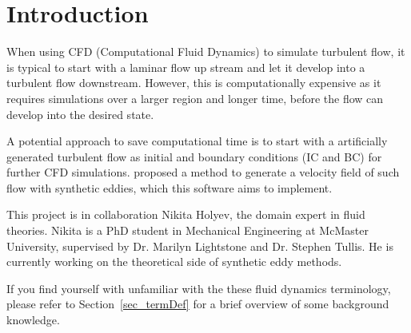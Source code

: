 \documentclass[12pt]{article}
\begin{document}





\section{Introduction}
When using CFD (Computational Fluid Dynamics) to simulate turbulent flow, it is typical to start with a laminar flow up stream and let it develop into a turbulent flow downstream. However, this is computationally expensive as it requires simulations over a larger region and longer time, before the flow can develop into the desired state. 

A potential approach to save computational time is to start with a artificially generated turbulent flow as initial and boundary conditions (IC and BC) for further CFD simulations. \citet{PolettoEtAl2013} proposed a method to generate a velocity field of such flow with synthetic eddies, which this software aims to implement.

This project is in collaboration Nikita Holyev, the domain expert in fluid theories. Nikita is a PhD student in Mechanical Engineering at McMaster University, supervised by Dr. Marilyn Lightstone and Dr. Stephen Tullis. He is currently working on the theoretical side of synthetic eddy methods.

If you find yourself with unfamiliar with the these fluid dynamics terminology, please refer to Section~\ref{sec_termDef} for a brief overview of some background knowledge.
\end{document}
